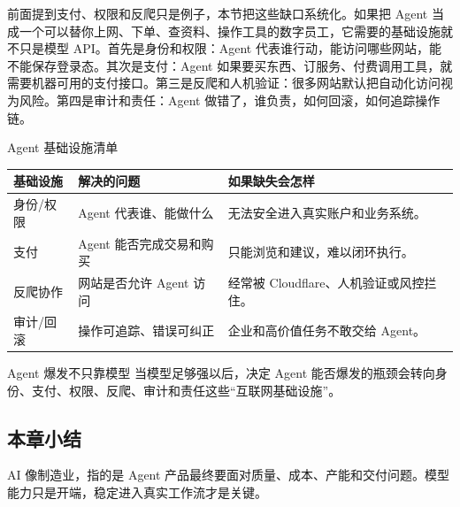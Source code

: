 前面提到支付、权限和反爬只是例子，本节把这些缺口系统化。如果把 Agent 当成一个可以替你上网、下单、查资料、操作工具的数字员工，它需要的基础设施就不只是模型 API。首先是身份和权限：Agent 代表谁行动，能访问哪些网站，能不能保存登录态。其次是支付：Agent 如果要买东西、订服务、付费调用工具，就需要机器可用的支付接口。第三是反爬和人机验证：很多网站默认把自动化访问视为风险。第四是审计和责任：Agent 做错了，谁负责，如何回滚，如何追踪操作链。

\begin{knowledgebox}{Agent 基础设施清单}
\begin{tabularx}{\textwidth}{p{}p{}X}
\toprule
基础设施 & 解决的问题 & 如果缺失会怎样 \\
\midrule
身份/权限 & Agent 代表谁、能做什么 & 无法安全进入真实账户和业务系统。 \\
支付 & Agent 能否完成交易和购买 & 只能浏览和建议，难以闭环执行。 \\
反爬协作 & 网站是否允许 Agent 访问 & 经常被 Cloudflare、人机验证或风控拦住。 \\
审计/回滚 & 操作可追踪、错误可纠正 & 企业和高价值任务不敢交给 Agent。 \\
\bottomrule
\end{tabularx}
\end{knowledgebox}

\begin{importantbox}{Agent 爆发不只靠模型}
当模型足够强以后，决定 Agent 能否爆发的瓶颈会转向身份、支付、权限、反爬、审计和责任这些“互联网基础设施”。
\end{importantbox}

\subsection{本章小结}

AI 像制造业，指的是 Agent 产品最终要面对质量、成本、产能和交付问题。模型能力只是开端，稳定进入真实工作流才是关键。


